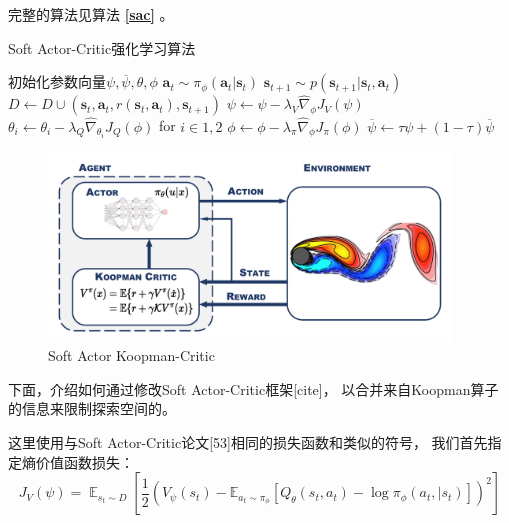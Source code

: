 \documentclass[AutoFakeBold]{LZUThesis}
\begin{document}
完整的算法见算法 \textbf{\ref{sac}} 。

\begin{algorithm}[H]
  \caption{Soft Actor-Critic强化学习算法}
  \label{sac}
  \begin{algorithmic}[1]
    \State 初始化参数向量$\psi, \overline{\psi},\theta,\phi$
	\State $\mathbf{a}_t \sim \pi_\phi(\mathbf{a}_t | \mathbf{s}_t)$
	\State $\mathbf{s}_{t + 1} \sim p(\mathbf{s}_{t + 1} | \mathbf{s}_t, \mathbf{a}_t)$
	\State $D \leftarrow D \cup { (\mathbf{s}_t, \mathbf{a}_t, r(\mathbf{s}_t, \mathbf{a}_t), \mathbf{s}_{t + 1}) }$
      \EndFor
	\State $\psi \leftarrow \psi - \lambda_V \hat{\nabla}_\phi J_V(\psi)$
	\State $\theta_i \leftarrow \theta_i - \lambda_Q \hat{\nabla}_{\theta_i}
	J_Q(\phi)$ for $i \in {1, 2}$
	\State $\phi \leftarrow \phi - \lambda_\pi \hat{\nabla}_\phi J_\pi(\phi)$
	\State $\overline{\psi} \leftarrow \tau \psi + (1 - \tau) \overline{\psi}$
      \EndFor
    \EndFor
  \end{algorithmic}
\end{algorithm}

\begin{figure}[htbp]
  \centering
    \includegraphics[width=0.95\textwidth]{figures/sakc.pdf}
  \caption{Soft Actor Koopman-Critic}
  \label{fig_sakc}
\end{figure}

下面，介绍如何通过修改Soft Actor-Critic框架[cite]，
以合并来自Koopman算子的信息来限制探索空间的。

这里使用与Soft Actor-Critic论文[53]相同的损失函数和类似的符号，
我们首先指定熵价值函数损失：
\begin{equation}
  J_{V}(\psi) = \mathop{\mathbb{E}}_{s_t \sim D}
  \left[ \frac12 ( V_{\psi}(s_t) - \mathbb{E}_{a_t \sim \pi_{\phi}}
  \left[ Q_\theta(s_t, a_t) - \log \pi_{\phi}(a_t, | s_t) \right] )^2 \right]
\end{equation}
\end{document}
